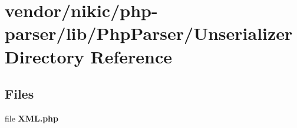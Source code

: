 \section{vendor/nikic/php-\/parser/lib/\+Php\+Parser/\+Unserializer Directory Reference}
\label{dir_bcdfbadb796abf93074fadd161693e2e}
\subsection*{Files}
\begin{DoxyCompactItemize}
\item 
file {\bf X\+M\+L.\+php}
\end{DoxyCompactItemize}
